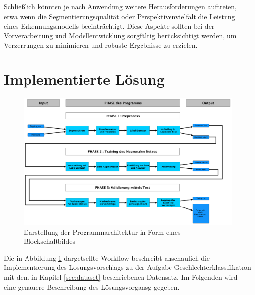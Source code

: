 \documentclass[journal,twoside,web]{ieeecolor}
\begin{document}
Schließlich könnten je nach Anwendung weitere Herausforderungen auftreten, etwa wenn die Segmentierungsqualität oder Perspektivenvielfalt die Leistung eines Erkennungsmodells beeinträchtigt. Diese Aspekte sollten bei der Vorverarbeitung und Modellentwicklung sorgfältig berücksichtigt werden, um Verzerrungen zu minimieren und robuste Ergebnisse zu erzielen.

\section{Implementierte Lösung}

\begin{figure}[H]
    \centerline{\includegraphics[width=\columnwidth]{Architektur.png}}
    \caption{Darstellung der Programmarchitektur in Form eines Blockschaltbildes}
    \label{fig:architecture}
\end{figure}

Die in Abbildung \ref{fig:architecture} dargetsellte Workflow beschreibt anschaulich die Implementierung des Lösungsvorschlags zu der Aufgabe Geschlechterklassifikation mit dem in Kapitel \ref{sec:dataset} beschriebenen Datensatz.
Im Folgenden wird eine genauere Beschreibung des Lösungsvorgansg gegeben.
\end{document}
